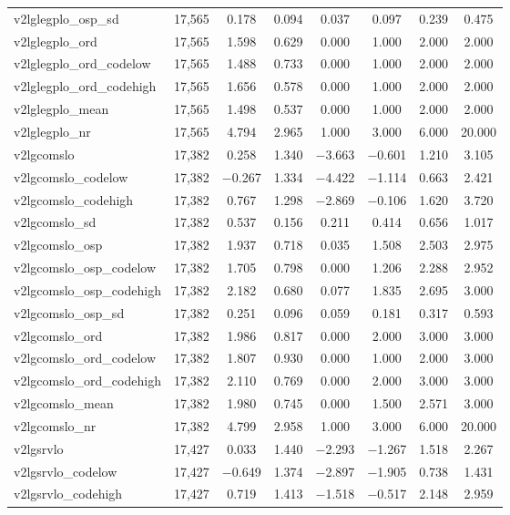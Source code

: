\begin{table}[!htbp]
\begin{tabular}{@{\extracolsep{5pt}}lccccccc}
v2lglegplo\_osp\_sd & 17,565 & 0.178 & 0.094 & 0.037 & 0.097 & 0.239 & 0.475 \\ 
v2lglegplo\_ord & 17,565 & 1.598 & 0.629 & 0.000 & 1.000 & 2.000 & 2.000 \\ 
v2lglegplo\_ord\_codelow & 17,565 & 1.488 & 0.733 & 0.000 & 1.000 & 2.000 & 2.000 \\ 
v2lglegplo\_ord\_codehigh & 17,565 & 1.656 & 0.578 & 0.000 & 1.000 & 2.000 & 2.000 \\ 
v2lglegplo\_mean & 17,565 & 1.498 & 0.537 & 0.000 & 1.000 & 2.000 & 2.000 \\ 
v2lglegplo\_nr & 17,565 & 4.794 & 2.965 & 1.000 & 3.000 & 6.000 & 20.000 \\ 
v2lgcomslo & 17,382 & 0.258 & 1.340 & $-$3.663 & $-$0.601 & 1.210 & 3.105 \\ 
v2lgcomslo\_codelow & 17,382 & $-$0.267 & 1.334 & $-$4.422 & $-$1.114 & 0.663 & 2.421 \\ 
v2lgcomslo\_codehigh & 17,382 & 0.767 & 1.298 & $-$2.869 & $-$0.106 & 1.620 & 3.720 \\ 
v2lgcomslo\_sd & 17,382 & 0.537 & 0.156 & 0.211 & 0.414 & 0.656 & 1.017 \\ 
v2lgcomslo\_osp & 17,382 & 1.937 & 0.718 & 0.035 & 1.508 & 2.503 & 2.975 \\ 
v2lgcomslo\_osp\_codelow & 17,382 & 1.705 & 0.798 & 0.000 & 1.206 & 2.288 & 2.952 \\ 
v2lgcomslo\_osp\_codehigh & 17,382 & 2.182 & 0.680 & 0.077 & 1.835 & 2.695 & 3.000 \\ 
v2lgcomslo\_osp\_sd & 17,382 & 0.251 & 0.096 & 0.059 & 0.181 & 0.317 & 0.593 \\ 
v2lgcomslo\_ord & 17,382 & 1.986 & 0.817 & 0.000 & 2.000 & 3.000 & 3.000 \\ 
v2lgcomslo\_ord\_codelow & 17,382 & 1.807 & 0.930 & 0.000 & 1.000 & 2.000 & 3.000 \\ 
v2lgcomslo\_ord\_codehigh & 17,382 & 2.110 & 0.769 & 0.000 & 2.000 & 3.000 & 3.000 \\ 
v2lgcomslo\_mean & 17,382 & 1.980 & 0.745 & 0.000 & 1.500 & 2.571 & 3.000 \\ 
v2lgcomslo\_nr & 17,382 & 4.799 & 2.958 & 1.000 & 3.000 & 6.000 & 20.000 \\ 
v2lgsrvlo & 17,427 & 0.033 & 1.440 & $-$2.293 & $-$1.267 & 1.518 & 2.267 \\ 
v2lgsrvlo\_codelow & 17,427 & $-$0.649 & 1.374 & $-$2.897 & $-$1.905 & 0.738 & 1.431 \\ 
v2lgsrvlo\_codehigh & 17,427 & 0.719 & 1.413 & $-$1.518 & $-$0.517 & 2.148 & 2.959 \\ 

\end{tabular}
\end{table}
